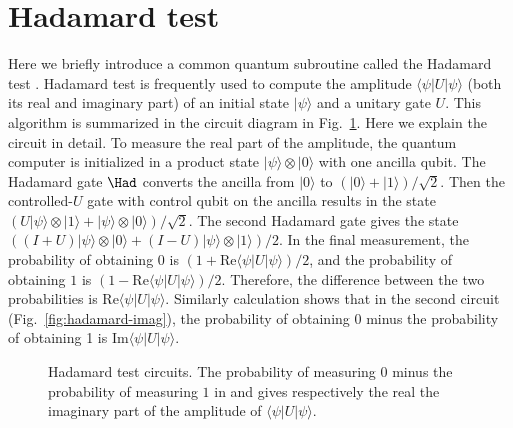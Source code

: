 \section{Hadamard test}\label{sec:hadamard-test}


Here we briefly introduce a common quantum subroutine called the Hadamard test \cite{nielsenQuantumComputationQuantum2010}. Hadamard test is frequently used to compute the amplitude $\langle \psi |U|\psi \rangle $ (both its real and imaginary part) of an initial state $|\psi \rangle $ and a unitary gate $U$. This algorithm is summarized in the circuit diagram in Fig.~\ref{fig:hadamard-test}. Here we explain the circuit in detail. To measure the real part of the amplitude, the quantum computer is initialized in a product state $|\psi \rangle \otimes |0\rangle $ with one ancilla qubit. The Hadamard gate $\Had$ converts the ancilla from $|0\rangle $ to $( |0\rangle +|1\rangle ) /\sqrt{2}$. Then the controlled-$U$ gate with control qubit on the ancilla results in the state $( U|\psi \rangle \otimes |1\rangle +|\psi \rangle \otimes |0\rangle ) /\sqrt{2}$. The second Hadamard gate gives the state $(( I+U) |\psi \rangle \otimes |0\rangle +( I-U) |\psi \rangle \otimes |1\rangle ) /2$. In the final measurement, the probability of obtaining $0$ is $( 1+\mathrm{Re} \langle \psi |U|\psi \rangle ) /2$, and the probability of obtaining $1$ is $( 1-\mathrm{Re} \langle \psi |U|\psi \rangle ) /2$. Therefore, the difference between the two probabilities is $\mathrm{Re} \langle \psi |U|\psi \rangle $. Similarly calculation shows that in the second circuit (Fig.~\ref{fig:hadamard-imag}), the probability of obtaining 0 minus the probability of obtaining 1 is $\mathrm{Im} \langle \psi |U|\psi \rangle $.

\begin{figure} [ht]
  \centering
  \caption{
  Hadamard test circuits. The probability of measuring $0$ minus the probability of measuring
  $1$ in \protect{} and \protect{} 
  gives respectively the real the imaginary part of the amplitude
  of $\langle \psi|U|\psi \rangle$.
  }
  \label{fig:hadamard-test}
\end{figure}



